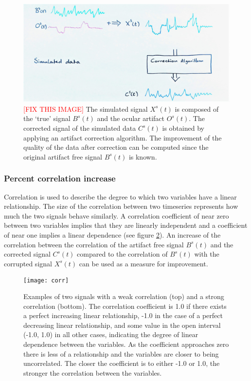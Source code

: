 \documentclass[twoside]{article}
\begin{document}
\begin{figure}
\centering

  \includegraphics[width=.99\linewidth]{IMG_20170802_161247}
  \caption{\textcolor{red}{[FIX THIS IMAGE]} The simulated signal $X^s(t)$ is composed of the `true' signal $B^s(t)$ and the ocular artifact $O^s(t)$. The corrected signal of the simulated data $C^s(t)$ is obtained by applying an artifact correction algorithm. The improvement of the quality of the data after correction can be computed since the original artifact free signal $B^s(t)$ is known.}
  

\label{fig:simulations}
\end{figure}


\subsubsection{Percent correlation increase}
Correlation is used to describe the degree to which two variables have a linear relationship. The size of the correlation between two timeseries represents how much the two signals behave similarly. A correlation coefficient of near zero between two variables implies that they are linearly independent and a coefficient of near one implies a linear dependence (see figure \ref{fig:corr}). An increase of the correlation between the correlation of the artifact free signal $B^s(t)$ and the corrected signal $C^s(t)$ compared to the correlation of $B^s(t)$ with the corrupted signal $X^s(t)$ can be used as a measure for improvement. 

\begin{figure}
\centering

  \texttt{[image: corr]}
  \caption{Examples of two signals with a weak correlation (top) and a strong correlation (bottom). The correlation coefficient is 1.0 if there exists a perfect increasing linear relationship, -1.0 in the case of a perfect decreasing linear relationship, and some value in the open interval (-1.0, 1.0) in all other cases, indicating the degree of linear dependence between the variables. As the coefficient approaches zero there is less of a relationship and the variables are closer to being uncorrelated. The closer the coefficient is to either -1.0 or 1.0, the stronger the correlation between the variables.}
  

\label{fig:corr}
\end{figure}
\end{document}

